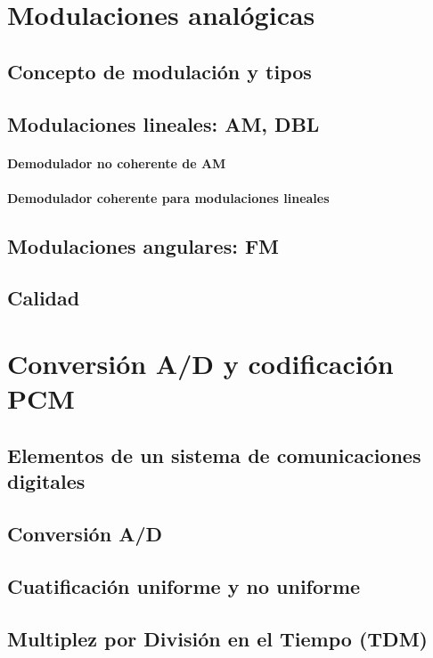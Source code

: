 \documentclass[a4paper]{book}
\begin{document}
\chapter{Modulaciones analógicas}
\section{Concepto de modulación y tipos}
\section{Modulaciones lineales: AM, DBL}

\subsubsection{Demodulador no coherente de AM}
\subsubsection{Demodulador coherente para modulaciones lineales}

\section{Modulaciones angulares: FM}
\section{Calidad}

\chapter{Conversión A/D y codificación PCM}
\section{\texorpdfstring{Elementos de un sistema de comunicaciones\\ digitales}{Elementos de un sistema de comunicaciones digitales}}
\section{Conversión A/D}
\section{Cuatificación uniforme y no uniforme}
\section{Multiplez por División en el Tiempo (TDM)}
\end{document}
